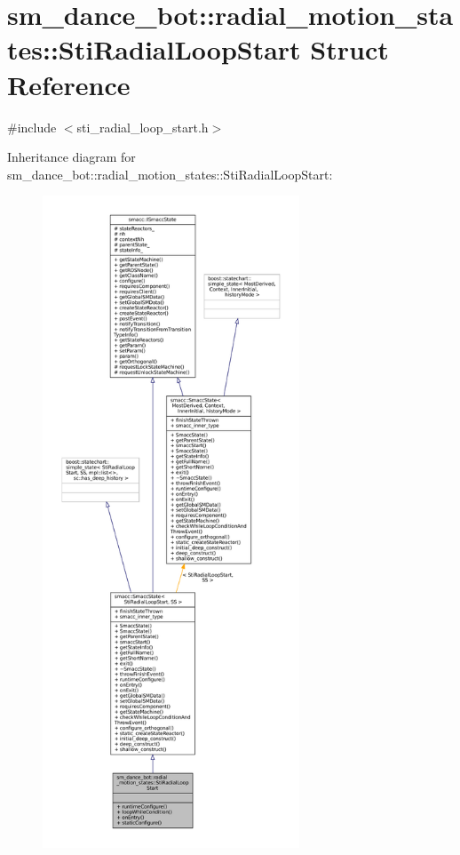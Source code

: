 \hypertarget{structsm__dance__bot_1_1radial__motion__states_1_1StiRadialLoopStart}{}\section{sm\+\_\+dance\+\_\+bot\+:\+:radial\+\_\+motion\+\_\+states\+:\+:Sti\+Radial\+Loop\+Start Struct Reference}
\label{structsm__dance__bot_1_1radial__motion__states_1_1StiRadialLoopStart}


{\ttfamily \#include $<$sti\+\_\+radial\+\_\+loop\+\_\+start.\+h$>$}



Inheritance diagram for sm\+\_\+dance\+\_\+bot\+:\+:radial\+\_\+motion\+\_\+states\+:\+:Sti\+Radial\+Loop\+Start\+:
\nopagebreak
\begin{figure}[H]
\begin{center}
\leavevmode
\includegraphics[height=550pt]{structsm__dance__bot_1_1radial__motion__states_1_1StiRadialLoopStart__inherit__graph}
\end{center}
\end{figure}



